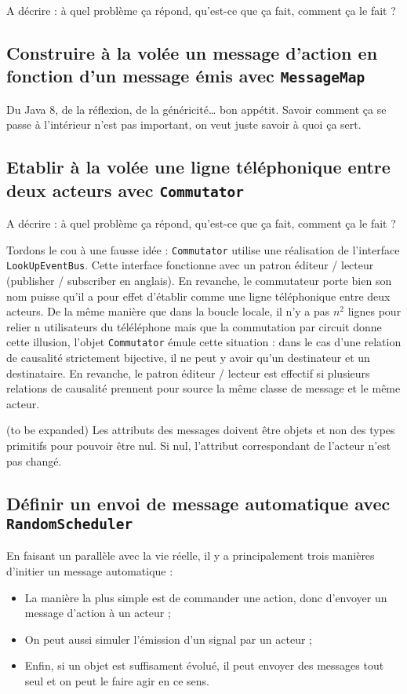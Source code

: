 \documentclass[11pt]{article}
\begin{document}
A décrire : à quel problème ça répond, qu'est-ce que ça fait, comment ça le fait ?

\subsection{Construire à la volée un message d'action en fonction d'un message émis avec \texttt{MessageMap}}

Du Java 8, de la réflexion, de la généricité… bon appétit. Savoir comment ça se passe à l'intérieur n'est pas important, on veut juste savoir à quoi ça sert.

\subsection{Etablir à la volée une ligne téléphonique entre deux acteurs avec \texttt{Commutator}}

A décrire : à quel problème ça répond, qu'est-ce que ça fait, comment ça le fait ?

Tordons le cou à une fausse idée : \texttt{Commutator} utilise une réalisation de l'interface \texttt{LookUpEventBus}. Cette interface fonctionne avec un patron éditeur / lecteur (\og publisher / subscriber \fg{} en anglais). En revanche, le commutateur porte bien son nom puisse qu'il a pour effet d'établir comme une ligne téléphonique entre deux acteurs. De la même manière que dans la boucle locale, il n'y a pas $n^2$ lignes pour relier n utilisateurs du téléléphone mais que la commutation par circuit donne cette illusion, l'objet \texttt{Commutator} émule cette situation : dans le cas d'une relation de causalité strictement bijective, il ne peut y avoir qu'un destinateur et un destinataire. En revanche, le patron éditeur / lecteur est effectif si plusieurs relations de causalité prennent pour source la même classe de message et le même acteur.

(to be expanded) Les attributs des messages doivent être objets et non des types primitifs pour pouvoir être nul. Si nul, l'attribut correspondant de l'acteur n'est pas changé.

\subsection{Définir un envoi de message automatique avec \texttt{RandomScheduler}}

En faisant un parallèle avec la vie réelle, il y a principalement trois manières d'initier un message automatique :
\begin{itemize}
\item La manière la plus simple est de commander une action, donc d'envoyer un message d'action à un acteur ;
\item On peut aussi simuler l'émission d'un signal par un acteur ;
\item Enfin, si un objet est suffisament évolué, il peut envoyer des messages tout seul et on peut le faire agir en ce sens.
\end{itemize}
\end{document}
